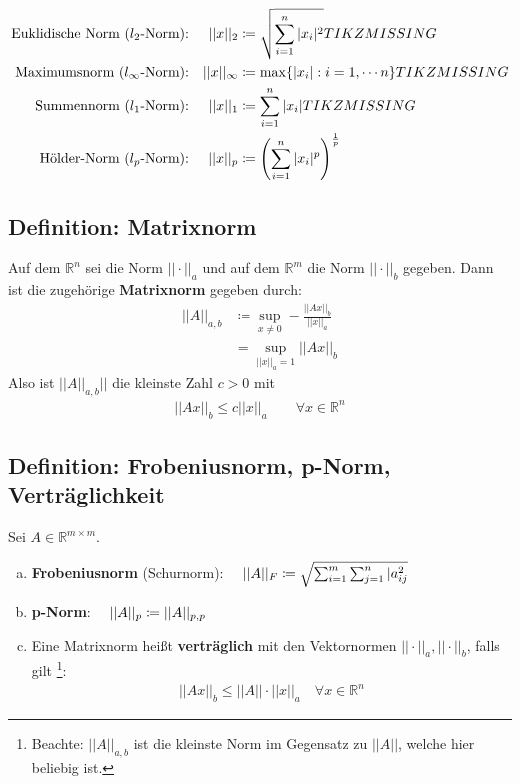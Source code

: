 \documentclass[ngerman,fontsize=11pt, paper=a4, parskip=false, titlepage=false, toc=bib]{scrbook}
\newcommand{\R}{\mathbb{R}}
\begin{document}
\begin{align*}
	\text{Euklidische Norm ($l_2$-Norm):} &&	||x||_2 &\coloneqq \sqrt{\sum_{i=1}^{n}|x_i|^2}
		\index{Norm!Euklidische Norm}
			TIKZ MISSING \\
	\text{Maximumsnorm ($l_\infty$-Norm):} &&	||x||_\infty &\coloneqq \max\{|x_i| : i=1, \cdots n\}
	  	\index{Norm!Maximumsnorm}
		  	TIKZ MISSING \\
	\text{Summennorm ($l_1$-Norm):} &&	||x||_1 &\coloneqq \sum_{i=1}^{n}|x_i| 
		\index{Norm!Summennorm}
			TIKZ MISSING \\
	\text{Hölder-Norm ($l_p$-Norm):} &&	||x||_p &\coloneqq 
		\left(\sum_{i=1}^{n}|x_i|^p\right)^{\frac{1}{p}} 
		\index{Norm!Hölder-Norm}
\end{align*}

\subsection{Definition: Matrixnorm} \label{3.2.4}
Auf dem $\R^n$  sei die Norm $||\cdot||_a$ und auf dem $\R^m$ die Norm $||\cdot||_b$ gegeben.
Dann ist die zugehörige \textbf{Matrixnorm}  gegeben durch:
\begin{align}
	||A||_{a,b} &\coloneqq \sup_{x\neq 0}- \frac{||Ax||_b}{||x||_a} \\ \nonumber
					 &= \sup_{||x||_a=1} ||Ax||_b \label{Matrixnorm} 
\end{align}
Also ist   $||A||_{a,b}||$ die kleinste Zahl $c>0$ mit
\begin{gather*}
	||Ax||_b  \leq c||x||_a \quad\quad \forall x\in \R^n
\end{gather*}

\subsection{Definition: Frobeniusnorm, p-Norm, Verträglichkeit} \label{3.2.5}
Sei $A\in \R^{m\times m}$.
\begin{enumerate}[a)]
	\item \textbf{Frobeniusnorm} (Schurnorm):
			 $ \quad ||A||_F \coloneqq \sqrt{\sum_{i=1}^{m}\sum_{j=1}^{n}|a_{ij}^2}
				 \index{Norm!Frobeniusnorm}$
    \item \textbf{p-Norm}: 
			 $\quad ||A||_p \coloneqq ||A||_{p,p}
				 \index{p-Norm}$
    \item Eine Matrixnorm heißt \textbf{verträglich}  mit den Vektornormen 
			    $||\cdot||_a, ||\cdot||_b$, falls gilt
			    \footnote{ Beachte: $||A||_{a,b}$ ist die kleinste Norm im Gegensatz zu $||A||$, welche hier beliebig ist.}:
				 \begin{gather*}
					 	||Ax||_b \leq ||A|| \cdot ||x||_a \quad \forall x\in \R^n
				 \end{gather*}
\end{enumerate}
\end{document}
